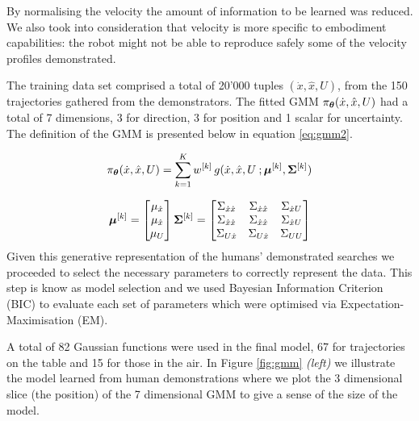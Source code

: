 By normalising the velocity the amount of information to be learned was reduced. We also took into consideration that velocity is more 
specific to embodiment capabilities: the robot might not be able to reproduce safely some of the velocity profiles demonstrated. 

The training data set comprised a total of 20'000 tuples $(\dot{x},\hat{x},U)$, from the 150 trajectories gathered from the demonstrators. 
The fitted GMM $\pi_{\boldsymbol{\theta}}(\dot{x},\hat{x},U)$ had a total of 7 dimensions, 3 for direction, 3 for position and 1 scalar for uncertainty. 
The definition of the GMM is presented below in equation \ref{eq:gmm2}.

\begin{equation} \label{eq:gmm2}
 \pi_{\boldsymbol{\theta}}(\dot{x},\hat{x},U) = \sum\limits_{k=1}^{K} w^{[k]}\, g(\dot{x},\hat{x},U\: ;\boldsymbol{\mu}^{[k]},\boldsymbol{\Sigma}^{[k]} )
\end{equation}

\begin{equation*}
    \boldsymbol{\mu}^{[k]} =
    \begin{bmatrix}
      \mu_{\dot{x}} \\
      \mu_{\hat{x}} \\
      \mu_{U}
    \end{bmatrix}
    \boldsymbol{\Sigma}^{[k]} =
    \begin{bmatrix}
      \Sigma_{\dot{x}\dot{x}} & \Sigma_{\dot{x}\hat{x}} & \Sigma_{\dot{x}U} \\
      \Sigma_{\hat{x}\dot{x}} & \Sigma_{\hat{x}\hat{x}} & \Sigma_{\hat{x}U} \\
      \Sigma_{U\dot{x}} & \Sigma_{U\hat{x}} & \Sigma_{UU}   
    \end{bmatrix}
\end{equation*}
Given this generative representation of the humans' demonstrated searches we proceeded to 
select the necessary parameters to correctly represent the data. This step
is know as model selection and we used Bayesian Information Criterion (BIC) to evaluate
each set of parameters which were optimised via Expectation-Maximisation (EM). 

A total of 82 Gaussian functions were used in the final model, 67 for trajectories on the table and 15 for those in the air. In Figure
\ref{fig:gmm} \textit{(left)} we illustrate the model learned from human demonstrations where we plot the 3 dimensional slice (the position) of the 7
dimensional GMM to give a sense of the size of the model.

